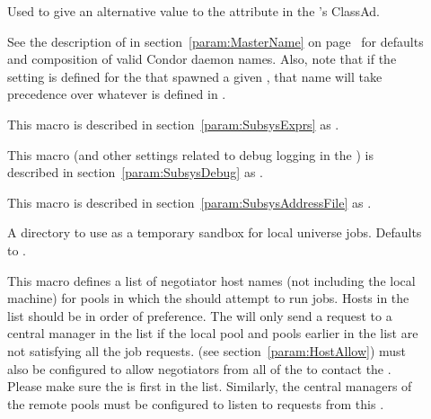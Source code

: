 \begin{description}
\item[] \label{param:ScheddName}
  Used to give an alternative value to the  attribute 
  in the 's ClassAd.

  See the description of  in
  section~\ref{param:MasterName} on page~\pageref{param:MasterName}
  for defaults and composition of valid Condor daemon names.
  Also, note that if the  setting is defined for
  the  that spawned a given , that name
  will take precedence over whatever is defined in
  . 

\item[] \label{param:ScheddAttrs} This macro is
  described in section~\ref{param:SubsysExprs} as
  .

\item[] \label{param:ScheddDebug} This macro
  (and other settings related to debug logging in the ) is
  described in section~\ref{param:SubsysDebug} as
  .

\item[] \label{param:ScheddAddressFile}
  This macro is described in
  section~\ref{param:SubsysAddressFile} as
  . 

\item[] \label{param:ScheddExecute}
  A directory to use as a temporary sandbox for local universe jobs.
  Defaults to .

\item[] \label{param:FlockNegotiatorHosts} 
  This macro defines a list of negotiator host names (not including the
  local  machine) for pools in which the
   should attempt to run jobs.  Hosts in the list should be in
  order of preference.  The  will only send a request to a
  central manager in the list if the local pool and pools earlier in
  the list are not satisfying all the job requests.
   (see
  section~\ref{param:HostAllow}) must also be configured to allow
  negotiators from all of the  to
  contact the .  Please make sure the
   is first in the
   list.  Similarly, the
  central managers of the remote pools must be configured to listen to
  requests from this .


\end{description}
